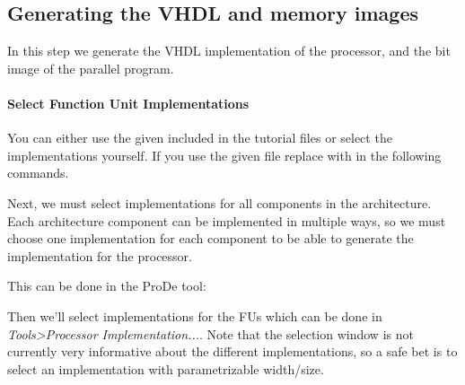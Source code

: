 \documentclass[twoside]{tceusermanual}
\begin{document}
\subsection{Generating the VHDL and memory images}
\label{ssec:tcetour_final_products}

In this step we generate the VHDL implementation of the processor, and the
bit image of the parallel program.

\paragraph{Select Function Unit Implementations}

% 
% 
% 
% 
% 

You can either use the given  included in the
tutorial files or select the implementations yourself. If you use the given
file replace  with  in the
following commands.

Next, we must select implementations for all components in the architecture.
Each architecture component can be implemented in multiple ways, so we must
choose one implementation for each component to be able to generate the
implementation for the processor.

This can be done in the ProDe tool:


Then we'll select implementations for the FUs which can be done in
\textit{Tools>Processor Implementation...}. Note that the selection window
is not currently very informative about the different implementations, so a
safe bet is to select an implementation with parametrizable width/size.
\end{document}
